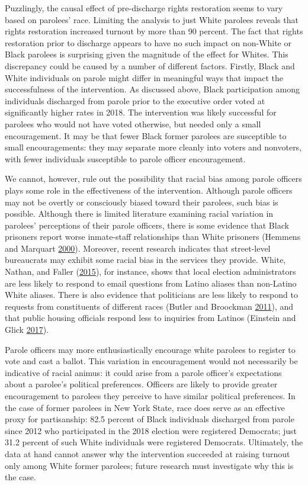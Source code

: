 \documentclass[
  12pt,
]{article}
\begin{document}
Puzzlingly, the causal effect of pre-discharge rights restoration seems to vary based on parolees' race. Limiting the analysis to just White parolees reveals that rights restoration increased turnout by more than 90 percent. The fact that rights restoration prior to discharge appears to have no such impact on non-White or Black parolees is surprising given the magnitude of the effect for Whites. This discrepancy could be caused by a number of different factors. Firstly, Black and White individuals on parole might differ in meaningful ways that impact the successfulness of the intervention. As discussed above, Black participation among individuals discharged from parole prior to the executive order voted at significantly higher rates in 2018. The intervention was likely successful for parolees who would not have voted otherwise, but needed only a small encouragement. It may be that fewer Black former parolees are susceptible to small encouragements: they may separate more cleanly into voters and nonvoters, with fewer individuals susceptible to parole officer encouragement.

We cannot, however, rule out the possibility that racial bias among parole officers plays some role in the effectiveness of the intervention. Although parole officers may not be overtly or consciously biased toward their parolees, such bias is possible. Although there is limited literature examining racial variation in parolees' perceptions of their parole officers, there is some evidence that Black prisoners report worse inmate-staff relationships than White prisoners (Hemmens and Marquart \protect\hyperlink{ref-Hemmens2000}{2000}). Moreover, recent research indicates that street-level bureaucrats may exhibit some racial bias in the services they provide. White, Nathan, and Faller (\protect\hyperlink{ref-White2015}{2015}), for instance, shows that local election administrators are less likely to respond to email questions from Latino aliases than non-Latino White aliases. There is also evidence that politicians are less likely to respond to requests from constituents of different races (Butler and Broockman \protect\hyperlink{ref-Butler2011}{2011}), and that public housing officials respond less to inquiries from Latinos (Einstein and Glick \protect\hyperlink{ref-Einstein2017}{2017}).

Parole officers may more enthusiastically encourage white parolees to register to vote and cast a ballot. This variation in encouragement would not necessarily be indicative of racial animus: it could arise from a parole officer's expectations about a parolee's political preferences. Officers are likely to provide greater encouragement to parolees they perceive to have similar political preferences. In the case of former parolees in New York State, race does serve as an effective proxy for partisanship: 82.5 percent of Black individuals discharged from parole since 2012 who participated in the 2018 election were registered Democrats; just 31.2 percent of such White individuals were registered Democrats. Ultimately, the data at hand cannot answer why the intervention succeeded at raising turnout only among White former parolees; future research must investigate why this is the case.
\end{document}

